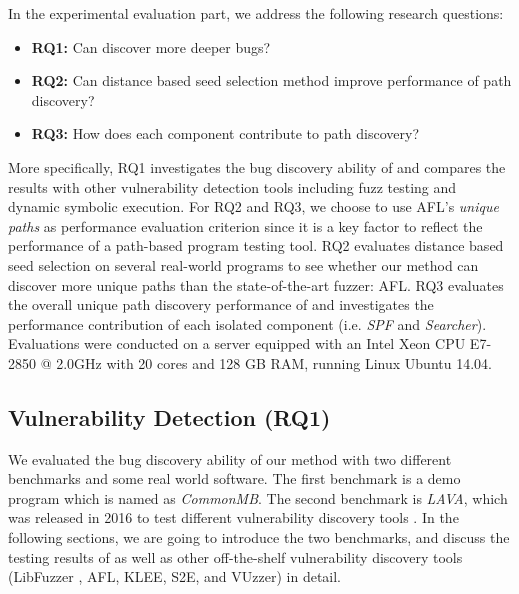 In the experimental evaluation part, we address the following 
research questions:
\begin{itemize}
\setlength{\itemsep}{0pt}
\item {\textbf{RQ1:} Can \prototype discover more deeper bugs?}
\item {\textbf{RQ2:} Can distance based seed selection method 
	improve performance of path discovery?}
\item {\textbf{RQ3:} How does each component contribute to 
	path discovery?}
\end{itemize}

More specifically, RQ1 investigates the bug discovery ability of 
\prototype and compares the results with other vulnerability 
detection tools including fuzz testing and dynamic symbolic execution. 
For RQ2 and RQ3, we choose to use AFL's \textit{unique paths} as performance evaluation criterion since it is a key factor to reflect the 
performance of a path-based program testing tool.
RQ2 evaluates distance based seed selection on several 
real-world programs to see whether our method can discover more 
unique paths than the state-of-the-art fuzzer: AFL. RQ3 evaluates 
the overall unique path discovery performance of \prototype and 
investigates the performance contribution of each isolated 
component (i.e. \textit{SPF} and \textit{Searcher}).
Evaluations were conducted on a server equipped
with an Intel Xeon CPU E7-2850 @ 2.0GHz with
20 cores and 128 GB RAM, running Linux Ubuntu 14.04.

\subsection{Vulnerability Detection (RQ1)}
We evaluated the bug discovery ability of our method with two 
different benchmarks and some real world software. The first 
benchmark is a demo program which is named as \emph{CommonMB}. 
The second benchmark is \emph{LAVA}, which was released in 2016 
to test different vulnerability discovery tools \cite{dolan2016lava}. 
In the following sections, we are going to introduce the 
two benchmarks, and discuss the testing results of \prototype
as well as other off-the-shelf vulnerability discovery tools 
(LibFuzzer \cite{libfuzzer}, AFL, KLEE, S2E, and VUzzer) in detail.


